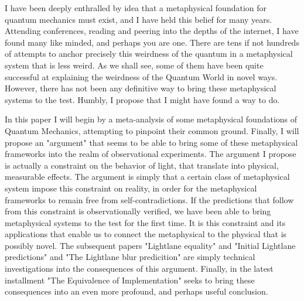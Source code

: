 \documentclass[notitlepage]{report}
\begin{document}
I have been deeply enthralled by idea that a metaphysical foundation for quantum mechanics must exist, and I have held this belief for many years.  Attending conferences, reading and peering into the depths of the internet, I have found many like minded, and perhaps you are one. There are tens if not hundreds of attempts to anchor precisely this weirdness of the quantum in a metaphysical system that is less weird. As we shall see, some of them have been quite successful at explaining the weirdness of the Quantum World in novel ways. However, there has not been any definitive way to bring these metaphysical systems to the test. Humbly, I propose that I might have found a way to do.

In this paper I will begin by a meta-analysis of some metaphysical foundations of Quantum Mechanics, attempting to pinpoint their common ground. Finally, I will propose an "argument" that seems to be able to bring some of these metaphysical frameworks into the realm of observational experiments. The argument I propose is actually a constraint on the behavior of light, that translate into physical, measurable effects. The argument is  simply that a certain class of metaphysical system  impose this constraint on reality, in order for the metaphysical frameworks to remain free from self-contradictions. If the predictions that follow from this constraint is observationally verified, we have been able to bring metaphysical systems to the test for the first time. It is this constraint and its applications that enable us to connect the metaphysical to the physical that is possibly novel. The subsequent papers "Lightlane equality" and "Initial Lightlane predictions" and  "The Lightlane blur predicition" are simply technical investigations into the consequences of this argument. Finally, in the latest installment "The Equivalence of Implementation" seeks to bring these consequences into an even more profound, and perhaps useful conclusion.
\end{document}
